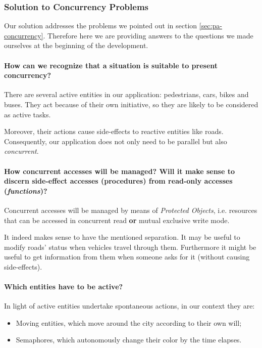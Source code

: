 \subsubsection{Solution to Concurrency Problems}

Our solution addresses the problems we pointed out in section
\ref{sec:pa-concurrency}.
Therefore here we are providing answers to the questions
we made ourselves at the beginning of the development.

\paragraph{How can we recognize that a situation is suitable to present
concurrency?}
There are several active entities in our application:
pedestrians, cars, bikes and buses.
They act because of their own initiative,
so they are likely to be considered as active tasks.

Moreover, their actions cause side-effects to reactive entities like roads.
Consequently, our application does not only need to be parallel
but also \textit{concurrent}.

\paragraph{How concurrent accesses will be managed? Will it make sense to
discern side-effect accesses (procedures) from read-only accesses
(\textit{functions})?}
Concurrent accesses will be managed by means of \textit{Protected Objects},
i.e. resources that can be accessed in concurrent read
\textbf{or} mutual exclusive write mode.

It indeed makes sense to have the mentioned separation.
It may be useful to modify roads' status when vehicles travel through them.
Furthermore it might be useful to get information from them
when someone asks for it (without causing side-effects).

\paragraph{Which entities have to be active?}
In light of active entities undertake spontaneous actions, in our context they are:
\begin{itemize}
  \item Moving entities, which move around the city according to their own will;
  \item Semaphores, which autonomously change their color by the time elapses.
\end{itemize}

